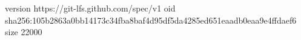 version https://git-lfs.github.com/spec/v1
oid sha256:105b2863a0bb14173c34fba8baf4d95df5da4285ed651eaadb0eaa9e4ffdaef6
size 22000
